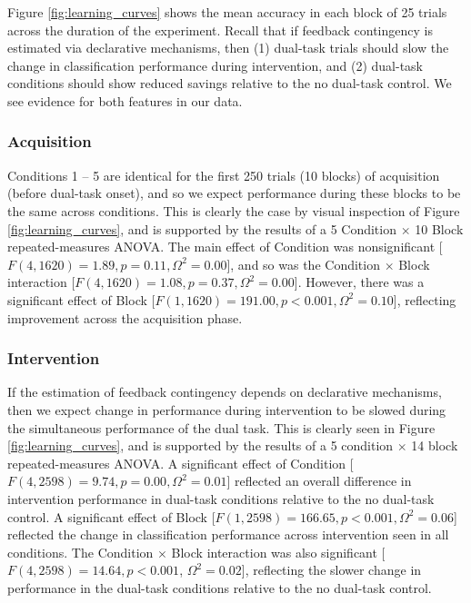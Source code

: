 \documentclass[man,apacite,draftfirst]{apa6} \usepackage{amsmath}
\begin{document}
Figure \ref{fig:learning_curves} shows the mean accuracy in each block of 25
trials across the duration of the experiment. Recall that if feedback
contingency is estimated via declarative mechanisms, then (1) dual-task trials
should slow the change in classification performance during intervention, and
(2) dual-task conditions should show reduced savings relative to the no
dual-task control. We see evidence for both features in our data.

\subsubsection*{Acquisition} Conditions 1 -- 5 are identical for the first 250
trials (10 blocks) of acquisition (before dual-task onset), and so we expect
performance during these blocks to be the same across conditions. This is
clearly the case by visual inspection of Figure \ref{fig:learning_curves}, and
is supported by the results of a 5 Condition $\times$ 10 Block repeated-measures
ANOVA. The main effect of Condition was nonsignificant [$F(4,1620) = 1.89, p =
0.11, \Omega^2 = 0.00$], and so was the Condition $\times$ Block interaction
[$F(4,1620) = 1.08, p = 0.37, \Omega^2 = 0.00$]. However, there was a
significant effect of Block [$F(1,1620) = 191.00, p < 0.001, \Omega^2 = 0.10$],
reflecting improvement across the acquisition phase.

\subsubsection*{Intervention} If the estimation of feedback contingency depends
on declarative mechanisms, then we expect change in performance during
intervention to be slowed during the simultaneous performance of the dual task.
This is clearly seen in Figure \ref{fig:learning_curves}, and is supported by
the results of a 5 condition $\times$ 14 block repeated-measures ANOVA. A
significant effect of Condition [$F(4,2598) = 9.74, p = 0.00, \Omega^2 = 0.01$]
reflected an overall difference in intervention performance in dual-task
conditions relative to the no dual-task control. A significant effect of Block
[$F(1,2598) = 166.65, p < 0.001, \Omega^2 = 0.06$] reflected the change in
classification performance across intervention seen in all conditions. The
Condition $\times$ Block interaction was also significant [$F(4,2598) = 14.64, p
< 0.001$, $\Omega^2 = 0.02$], reflecting the slower change in performance in the
dual-task conditions relative to the no dual-task control.
\end{document}
